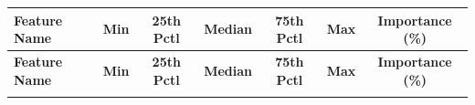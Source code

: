 \documentclass[11pt]{article}
\begin{document}
\begin{landscape}
\begin{center}
\footnotesize
{}

\begin{longtable}{
  >{\raggedright\arraybackslash}p{4.5cm}
  S[table-format=1.2e+2]
  S[table-format=1.2e+2]
  S[table-format=1.2e+2]
  S[table-format=1.2e+2]
  S[table-format=1.2e+2]
  S[table-format=2.2]
}
\toprule
\textbf{Feature Name} & {\textbf{Min}} & {\textbf{25th Pctl}} & {\textbf{Median}} & {\textbf{75th Pctl}} & {\textbf{Max}} & {\textbf{Importance (\%)}} \\
\midrule
\endfirsthead
\toprule
\textbf{Feature Name} & {\textbf{Min}} & {\textbf{25th Pctl}} & {\textbf{Median}} & {\textbf{75th Pctl}} & {\textbf{Max}} & {\textbf{Importance (\%)}} \\
\midrule
\endhead
\bottomrule
\endfoot


\end{longtable}
\end{center}
\end{landscape}
\end{document}
